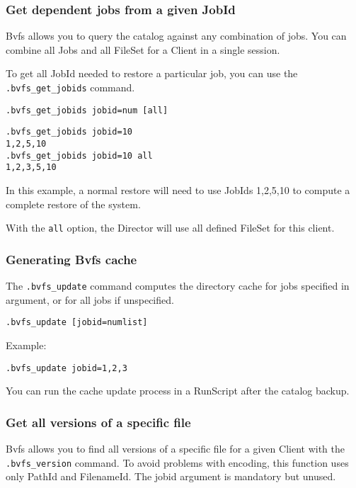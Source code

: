 \subsubsection*{Get dependent jobs from a given JobId}

Bvfs allows you to query the catalog against any combination of jobs. You
can combine all Jobs and all FileSet for a Client in a single session.

To get all JobId needed to restore a particular job, you can use the
\texttt{.bvfs\_get\_jobids} command.

\begin{verbatim}
.bvfs_get_jobids jobid=num [all]
\end{verbatim}

\begin{verbatim}
.bvfs_get_jobids jobid=10
1,2,5,10
.bvfs_get_jobids jobid=10 all
1,2,3,5,10
\end{verbatim}

In this example, a normal restore will need to use JobIds 1,2,5,10 to
compute a complete restore of the system.

With the \texttt{all} option, the Director will use all defined FileSet for
this client.

\subsubsection*{Generating Bvfs cache}

The \texttt{.bvfs\_update} command computes the directory cache for jobs
specified in argument, or for all jobs if unspecified.

\begin{verbatim}
.bvfs_update [jobid=numlist]
\end{verbatim}

Example:
\begin{verbatim}
.bvfs_update jobid=1,2,3
\end{verbatim}

You can run the cache update process in a RunScript after the catalog backup.

\subsubsection*{Get all versions of a specific file}

Bvfs allows you to find all versions of a specific file for a given Client with
the \texttt{.bvfs\_version} command. To avoid problems with encoding, this
function uses only PathId and FilenameId. The jobid argument is mandatory but
unused.


